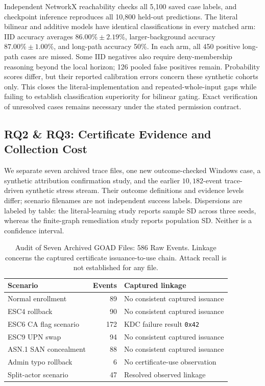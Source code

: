 

Independent NetworkX reachability checks all 5,100 saved case labels, and checkpoint inference reproduces all 10,800 held-out predictions. The literal bilinear and additive models have identical classifications in every matched arm: IID accuracy averages $86.00\%\pm2.19\%$, larger-background accuracy $87.00\%\pm1.00\%$, and long-path accuracy 50\%. In each arm, all 450 positive long-path cases are missed. Some IID negatives also require deny-membership reasoning beyond the local horizon; 126 pooled false positives remain. Probability scores differ, but their reported calibration errors concern these synthetic cohorts only. This closes the literal-implementation and repeated-whole-input gaps while failing to establish classification superiority for bilinear gating. Exact verification of unresolved cases remains necessary under the stated permission contract.

\subsection{RQ2 \& RQ3: Certificate Evidence and Collection Cost}
We separate seven archived trace files, one new outcome-checked Windows case, a synthetic attribution confirmation study, and the earlier $10,182$-event trace-driven synthetic stress stream. Their outcome definitions and evidence levels differ; scenario filenames are not independent success labels. Dispersions are labeled by table: the literal-learning study reports sample SD across three seeds, whereas the finite-graph remediation study reports population SD. Neither is a confidence interval.

\begin{table}[tbp]
\centering
\caption{Audit of Seven Archived GOAD Files: 586 Raw Events. Linkage concerns the captured certificate issuance-to-use chain. Attack recall is not established for any file.}
\label{tab:live_traces}
\evidencetable
\setlength{\tabcolsep}{2pt}
\begin{tabularx}{\linewidth}{@{}>{\raggedright\arraybackslash}p{.32\linewidth}rY@{}}
\toprule
Scenario & Events & Captured linkage \\
\midrule
Normal enrollment & 89 & No consistent captured issuance \\
ESC4 rollback & 90 & No consistent captured issuance \\
ESC6 CA flag scenario & 172 & KDC failure result \texttt{0x42} \\
ESC9 UPN swap & 94 & No consistent captured issuance \\
ASN.1 SAN concealment & 88 & No consistent captured issuance \\
Admin typo rollback & 6 & No certificate-use observation \\
Split-actor scenario & 47 & Resolved observed linkage \\
\bottomrule
\end{tabularx}
\end{table}

